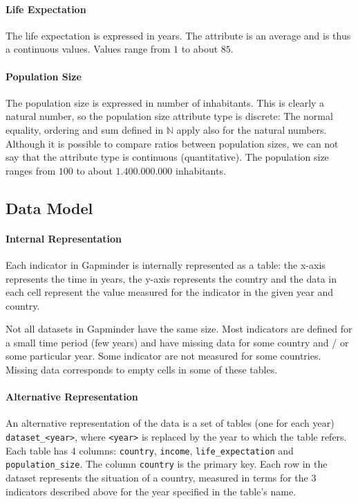 \paragraph{Life Expectation}
The life expectation is expressed in years.
The attribute is an average and is thus a continuous values. 
Values range from $1$ to about $85$.

\paragraph{Population Size}
The population size is expressed in number of inhabitants.
This is clearly a natural number, so the population size attribute type is discrete:
The normal equality, ordering and sum defined in $\mathbb{N}$ apply also for the natural numbers.
Although it is possible to compare ratios between population sizes, we can not say that the attribute type is continuous (quantitative). 
The population size ranges from $100$ to about $1.400.000.000$ inhabitants.


\subsection{Data Model}

\paragraph{Internal Representation}
Each indicator in Gapminder is internally represented as a table:
the x-axis represents the time in years, the y-axis represents the country and the data in each cell represent the value measured for the indicator in the given year and country.

Not all datasets in Gapminder have the same size.
Most indicators are defined for a small time period (few years) and have missing data for some country and / or some particular year.
Some indicator are not measured for some countries.
Missing data corresponds to empty cells in some of these tables.

\paragraph{Alternative Representation}
An alternative representation of the data is a set of tables (one for each year) \texttt{dataset\_<year>}, where \texttt{<year>} is replaced by the year to which the table refers.
Each table has $4$ columns: \texttt{country}, \texttt{income}, \texttt{life\_expectation} and \texttt{population\_size}.
The column \texttt{country} is the primary key.
Each row in the dataset represents the situation of a country, measured in terms for the $3$ indicators described above for the year specified in the table's name.

